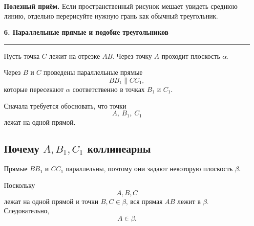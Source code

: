 \documentclass[a4paper,12pt]{article}
\newcommand{\lessonsection}[1]{%
  \vspace{0.4em}
  {\Large\bfseries\color{darkaccent}#1}\par
  \vspace{0.25em}
  {\color{lightaccent}\rule{\linewidth}{0.8pt}}
  \vspace{0.6em}
}
\newcommand{\key}[1]{\textbf{\color{darkaccent}#1}}
\begin{document}
\begin{center}
\end{center}

\key{Полезный приём.}
Если пространственный рисунок мешает увидеть среднюю линию, отдельно
перерисуйте нужную грань как обычный треугольник.

\lessonsection{6. Параллельные прямые и подобие треугольников}

Пусть точка \(C\) лежит на отрезке \(AB\). Через точку \(A\) проходит
плоскость \(\alpha\).

Через \(B\) и \(C\) проведены параллельные прямые
\[
BB_1\parallel CC_1,
\]
которые пересекают \(\alpha\) соответственно в точках \(B_1\) и \(C_1\).

Сначала требуется обосновать, что точки
\[
A,\ B_1,\ C_1
\]
лежат на одной прямой.

\subsection*{\color{darkaccent}Почему \(A,B_1,C_1\) коллинеарны}

Прямые \(BB_1\) и \(CC_1\) параллельны, поэтому они задают некоторую
плоскость \(\beta\).

Поскольку
\[
A,B,C
\]
лежат на одной прямой и точки \(B,C\in\beta\), вся прямая \(AB\) лежит
в \(\beta\). Следовательно,
\[
A\in\beta.
\]
\end{document}
